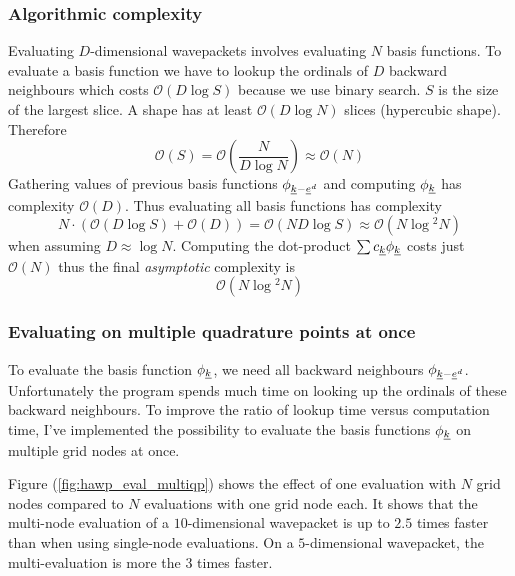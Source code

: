\documentclass{article}
\begin{document}
\subsubsection{Algorithmic complexity} \label{sec:hawp_eval_runtime_complexity}
Evaluating \(D\)-dimensional wavepackets involves evaluating \(N\) basis functions.
To evaluate a basis function we have to lookup the ordinals of \(D\)
backward neighbours which costs \(\mathcal{O}(D \log{}S)\) because we use binary search.
\(S\) is the size of the largest slice. A shape has at least \(\mathcal{O}(D\log{}N)\)
slices (hypercubic shape). Therefore
\[
  \mathcal{O}(S)=\mathcal{O}(\frac{N}{D\log{}N}) \approx \mathcal{O}(N)
\]
Gathering values of previous basis functions \(\phi_{\underline{k}-\underline{e}^d}\) and computing \(\phi_{\underline{k}}\)
has complexity \(\mathcal{O}(D)\).
Thus evaluating all basis functions has complexity
\[
  N \cdot \left(\mathcal{O}(D\log{}S) + \mathcal{O}(D)\right) =
  \mathcal{O}(ND\log{}S) \approx
  \mathcal{O}(N\log{}^2 N)
\]
when assuming \(D \approx \log{}N\).
Computing the dot-product \(\sum c_{\underline{k}}\phi_{\underline{k}}\) costs just \(\mathcal{O}(N)\)
thus the final \emph{asymptotic} complexity is
\begin{equation}
  \label{eq:hawp_eval_complexity}
  \mathcal{O}(N\log{}^2N)
\end{equation}

\subsubsection{Evaluating on multiple quadrature points at once}

To evaluate the basis function \(\phi_{\underline{k}}\), we need all backward neighbours
\(\phi_{\underline{k}-\underline{e}^d}\).
Unfortunately the program spends much time on looking up the ordinals of these
backward neighbours. To improve the ratio of lookup time versus computation time,
I've implemented the possibility to evaluate the basis functions \(\phi_{\underline{k}}\)
on multiple grid nodes at once.

Figure (\ref{fig:hawp_eval_multiqp}) shows the effect of one
evaluation with \(N\) grid nodes compared to \(N\) evaluations with one
grid node each. It shows that the multi-node evaluation of a \(10\)-dimensional
wavepacket is up to \(2.5\) times faster than when using single-node evaluations.
On a \(5\)-dimensional wavepacket, the multi-evaluation is more the \(3\) times faster.
\end{document}
